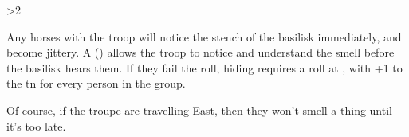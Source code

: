 \ifnum\value{temperature}>2

Any horses with the troop will notice the stench of the \gls{basilisk} immediately, and become jittery.
A  (\tn[10]) allows the troop to notice and understand the smell before the \gls{basilisk} hears them.
If they fail the roll, hiding requires a  roll at \tn[10], with +1 to the \gls{tn} for every person in the group.

Of course, if the troupe are travelling East, then they won't smell a thing until it's too late.

\basilisk

\fi

